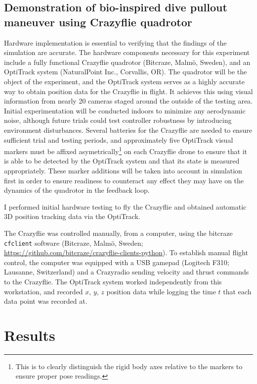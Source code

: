 \documentclass[onecolumn,10pt]{IEEEtran}
\begin{document}
\subsection{Demonstration of bio-inspired dive pullout maneuver using Crazyflie quadrotor}
	Hardware implementation is essential to verifying that the findings of the simulation are accurate. The hardware components necessary for this experiment include a fully functional Crazyflie quadrotor (Bitcraze, Malm\"{o}, Sweden), and an OptiTrack system (NaturalPoint Inc., Corvallis, OR). The quadrotor will be the object of the experiment, and the OptiTrack system serves as a highly accurate way to obtain position data for the Crazyflie in flight. It achieves this using visual information from nearly 20 cameras staged around the outside of the testing area. Initial experimentation will be conducted indoors to minimize any aerodynamic noise, although future trials could test controller robustness by introducing environment disturbances. Several batteries for the Crazyflie are needed to ensure sufficient trial and testing periods, and approximately five OptiTrack visual markers must be affixed asymetrically\footnote{This is to clearly distinguish the rigid body axes relative to the markers to ensure proper pose readings.} on each Crazyflie drone to ensure that it is able to be detected by the OptiTrack system and that its state is measured appropriately. These marker additions will be taken into account in simulation first in order to ensure readiness to counteract any effect they may have on the dynamics of the quadrotor in the feedback loop.

I performed initial hardware testing to fly the Crazyflie and obtained automatic 3D position tracking data via the OptiTrack. 

The Crazyflie was controlled manually, from a computer, using the bitcraze \lstinline{cfclient} software (Bitcraze, Malm\"{o}, Sweden; \url{https://github.com/bitcraze/crazyflie-clients-python}). To establish manual flight control, the computer was equipped with a USB gamepad (Logitech F310; Lausanne, Switzerland) and a Crazyradio sending velocity and thrust commands to the Crazyflie. The OptiTrack system worked independently from this workstation, and recorded $x$, $y$, $z$ position data while logging the time $t$ that each data point was recorded at. 







\section{Results}
\end{document}
